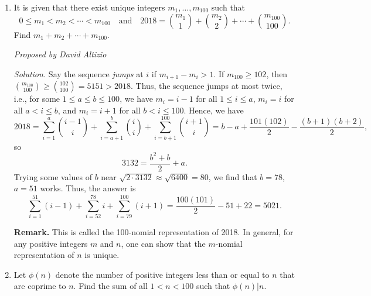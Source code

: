 \documentclass[10pt]{article}
\newcommand{\proposed}[1]
{
\vspace{5pt}
\noindent\textit{Proposed by #1}
}
\newcommand{\solution}
{
\vspace{5pt}
\noindent\textit{Solution.}\qquad
}
\begin{document}
\begin{enumerate}
\begin{soln}{Cody}
The answer is thus $\boxed{46}$.
\end{soln}
\fi

\solution First remark that if $a=2$, then the sequence repeats $2\mapsto3\mapsto 2\mapsto\cdots$, so in order to minimize $a_7$ it must be the case that $a_7 = 2$ and $a_6 \geq 3$.  (Note that the other way around is not possible, since for no integer $a\geq 4$ is $a^2-1$ a power of $2$.) Now examine $a_2$, noting that it is prime.  Then $a_3$ must satisfy \[a_3\mid a_2^2 - 1 = (a_2 - 1)(a_2 + 1).\] Since $a_2$ is an odd prime, $a_2-1$ and $a_2 + 1$ are both even, and so $a_3\leq\frac{a_2+1}2$.  Thus \[a_2\geq 2a_3 - 1\geq 4a_4 - 3\geq\cdots\geq 16a_6 - 15 \geq 33,\] where here we use the fact that $a_6\geq 3$.  Trying a few primes past $33$ shows that in fact \[47\mapsto 23\mapsto 11\mapsto 5\mapsto 3\mapsto 2\] gives a valid sequence $a_2,\ldots, a_7$ of distinct integers.  Hence the smallest possible value of $a_2$ is $47$, meaning the smallest possible value of $a_1$ is $\boxed{46}$.

\item It is given that there exist unique integers $m_1,\ldots, m_{100}$ such that \[0\leq m_1 < m_2 < \cdots < m_{100}\quad\text{and}\quad 2018 = \binom{m_1}1 + \binom{m_2}2 + \cdots + \binom{m_{100}}{100}.\] Find $m_1 + m_2 + \cdots + m_{100}$.

\proposed{David Altizio}

\solution Say the sequence \emph{jumps} at $i$ if $m_{i+1}-m_i>1$. If $m_{100}\ge102$, then $\binom{m_{100}}{100}\ge\binom{102}{100}=5151>2018$. Thus, the sequence jumps at most twice, i.e., for some $1\le a\le b\le100$, we have $m_i=i-1$ for all $1\le i\le a$, $m_i=i$ for all $a<i\le b$, and $m_i=i+1$ for all $b<i\le100$. Hence, we have \[2018=\sum_{i=1}^a\binom{i-1}i+\sum_{i=a+1}^b\binom{i}i+\sum_{i=b+1}^{100}\binom{i+1}i=b-a+\frac{101(102)}2-\frac{(b+1)(b+2)}2,\] so \[3132=\frac{b^2+b}2+a.\] Trying some values of $b$ near $\sqrt{2\cdot3132}\approx\sqrt{6400}=80$, we find that $b=78$, $a=51$ works. Thus, the answer is \[\sum_{i=1}^{51}(i-1)+\sum_{i=52}^{78}i+\sum_{i=79}^{100}(i+1)=\frac{100(101)}2-51+22=\boxed{5021}.\]

\textbf{Remark.} This is called the 100-nomial representation of 2018.  In general, for any positive integers $m$ and $n$, one can show that the $m$-nomial representation of $n$ is unique.

\item Let $\phi(n)$ denote the number of positive integers less than or equal to $n$ that are coprime to $n$. Find the sum of all $1 < n < 100$ such that $\phi(n) | n$. 


\end{enumerate}
\end{document}
